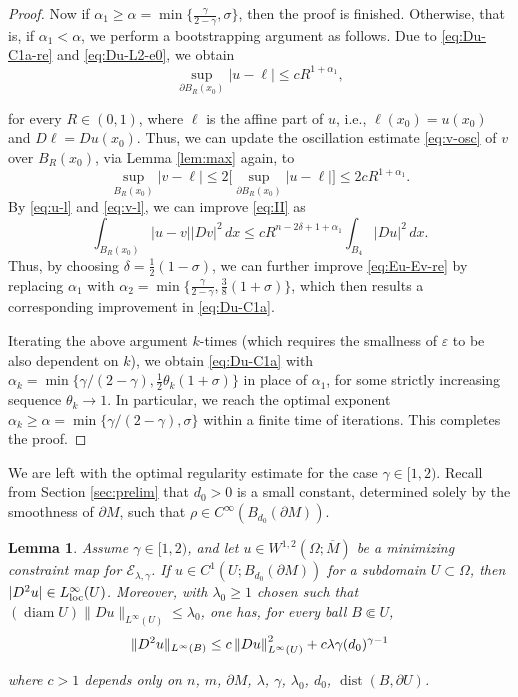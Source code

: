 \documentclass[11pt]{amsart}
\newcommand{\cE}{{\mathcal E}}
\def\loc{{\textup{loc}}}
\def\loc{{\textup{loc}}}
\newcommand{\e}{\varepsilon}
\newcommand{\diam}{\operatorname{diam}}
\newcommand{\dist}{\operatorname{dist}}
\newcommand\norm[1]{\left\Arrowvert {#1} \right\Arrowvert}
\theoremstyle{plain}
\newtheorem{lem}[thm]{Lemma}
\theoremstyle{definition}
\theoremstyle{remark}
\numberwithin{equation}{section}
\begin{document}
\begin{proof}
Now if $\alpha_1 \geq \alpha = \min\{\frac{\gamma}{2-\gamma},\sigma\}$, then the proof is finished. Otherwise, that is, if $\alpha_1 < \alpha$, we perform a bootstrapping argument as follows. Due to \eqref{eq:Du-C1a-re} and \eqref{eq:Du-L2-e0}, we obtain  
\begin{equation}
    \label{eq:u-l}
\sup_{\partial B_R(x_0)}| u - \ell| \leq c R^{1+\alpha_1},
\end{equation}

for every $R \in (0,1)$, where $\ell$ is the affine part of $u$, i.e., $\ell(x_0) = u(x_0)$ and $D\ell = Du(x_0)$. Thus, we can update the oscillation estimate \eqref{eq:v-osc} of $v$ over $B_R(x_0)$, via Lemma \ref{lem:max} again, to  
\begin{equation}
    \label{eq:v-l}
    \sup_{B_R(x_0)} |v- \ell| \leq 2\bigg[\sup_{\partial B_R(x_0)} |u - \ell| \bigg] \leq 2cR^{1+\alpha_1}.
\end{equation} 
By \eqref{eq:u-l} and \eqref{eq:v-l}, we can improve \eqref{eq:II} as
\begin{equation}
    \label{eq:II-re}
    \int_{B_R(x_0)} |u-v||Dv|^2\,dx \leq  c R^{n  - 2\delta + 1 + \alpha_1}\int_{B_4}|Du|^2\,dx. 
\end{equation}
Thus, by choosing $\delta = \frac{1}{2}(1-\sigma)$, we can further improve \eqref{eq:Eu-Ev-re} by replacing $\alpha_1$ with $\alpha_2 = \min\{\frac{\gamma}{2-\gamma},\frac{3}{8}(1+\sigma)\}$, which then results a corresponding improvement in \eqref{eq:Du-C1a}.

Iterating the above argument $k$-times (which requires the smallness of ${\e}$ to be also dependent on $k$), we obtain \eqref{eq:Du-C1a} with $\alpha_k = \min\{\gamma/(2-\gamma),\frac{1}{2}\theta_k(1+\sigma)\}$ in place of $\alpha_1$, for some strictly increasing sequence $\theta_k\to 1$. In particular, we reach the optimal exponent $\alpha_k \geq \alpha = \min\{\gamma/(2-\gamma),\sigma\}$ within a finite time of iterations. This completes the proof. 
\end{proof}

We are left with the optimal regularity estimate for the case $\gamma\in[1,2)$. Recall from Section \ref{sec:prelim} that $d_0 > 0$ is a small constant, determined solely by the smoothness of $\partial M$, such that $\rho\in C^\infty(B_{d_0}(\partial M))$. 

\begin{lem}
    \label{lem:C1a-sup}
    Assume $\gamma \in [1,2)$, and let $u\in W^{1,2}(\Omega;\overline M)$ be a minimizing constraint map for $\cE_{\lambda,\gamma}$. If $u\in C^1(U; B_{d_0}(\partial M))$ for a subdomain $U\subset\Omega$, then $|D^2u| \in L_\loc^\infty(U)$. Moreover, with $\lambda_0 \geq 1$ chosen such that $(\diam U)\| Du\|_{L^\infty(U)} \leq \lambda_0$, one has, for every ball $B\Subset U$,
    $$
    \| D^2 u \|_{L^\infty(B)} \leq  c\norm{Du}_{L^\infty(U)}^2 + c\lambda \gamma (d_0)^{\gamma-1} 
    $$

    where $c>1$ depends only on $n$, $m$, $\partial M$, $\lambda$, $\gamma$,  $\lambda_0$, $d_0$, $\dist(B, \partial U)$.  
\end{lem}
\end{document}
